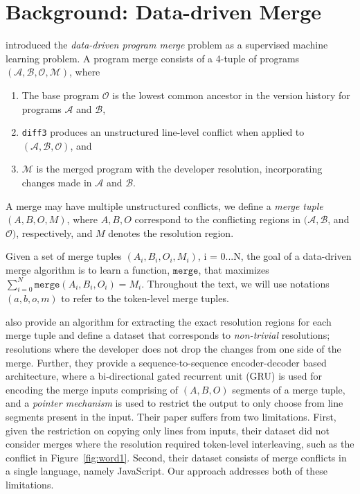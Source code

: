 \section{Background: Data-driven Merge}
\label{sec:background}
\citet{Dinella2021} introduced the {\it data-driven program merge} problem as a supervised machine learning problem. 
A program merge consists of a 4-tuple of programs $(\mathcal{A}, \mathcal{B}, \mathcal{O}, \mathcal{M})$, where 
\begin{enumerate} 
\item The base program $\mathcal{O}$ is the lowest common ancestor in the version history for programs $\mathcal{A}$ and $\mathcal{B}$, 
\item \texttt{diff3} produces an unstructured line-level conflict when applied to $(\mathcal{A}, \mathcal{B}, \mathcal{O})$, and 
\item $\mathcal{M}$ is the merged program with the developer resolution, incorporating changes made in  $\mathcal{A}$ and $\mathcal{B}$. 
\end{enumerate}
A merge may have multiple unstructured conflicts, we define a {\it merge tuple} $(A, B, O, M)$, where $A, B, O$ correspond to the conflicting regions in $(\mathcal{A}, \mathcal{B}$, and $\mathcal{O})$, respectively, and $M$ denotes the resolution region.

Given a set of merge tuples $(A_i, B_i, O_i, M_i)$, i = 0...N, the goal of a data-driven merge algorithm is to learn a function, $\texttt{merge}$, that maximizes $\sum_{i=0}^{N}\texttt{merge}(A_i, B_i, O_i) = M_i$.
Throughout the text, we will use notations $(a, b, o, m)$ to refer to the token-level merge tuples. 

\citet{Dinella2021} also provide an algorithm for extracting the exact resolution regions for each merge tuple and define a dataset that corresponds to {\it non-trivial} resolutions; resolutions where the developer does not drop the changes from one side of the merge.  
Further, they provide a sequence-to-sequence encoder-decoder based architecture, where a bi-directional gated recurrent unit (GRU) is used for encoding the merge inputs comprising of $(A, B, O)$ segments of a merge tuple, and a {\it pointer mechanism} is used to restrict the output to only choose from line segments present in the input. 
Their paper suffers from two limitations.
First, given the restriction on copying only lines from inputs, their dataset  did not consider merges where the resolution required token-level interleaving, such as the conflict in Figure~\ref{fig:word1}. 
Second, their dataset consists of merge conflicts in a single language, namely JavaScript. 
Our approach addresses both of these limitations.
